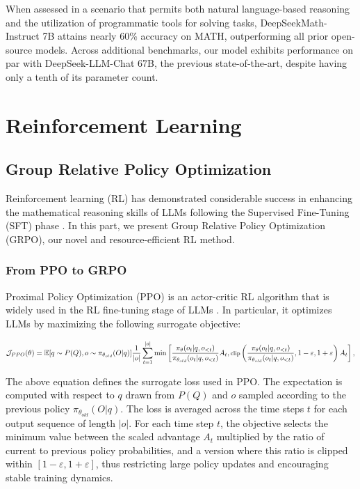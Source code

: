 \begin{itemize}[topsep=0pt]
\begin{itemize}[topsep=0pt]
When assessed in a scenario that permits both natural language-based reasoning and the utilization of programmatic tools for solving tasks, DeepSeekMath-Instruct 7B attains nearly 60\% accuracy on MATH, outperforming all prior open-source models. Across additional benchmarks, our model exhibits performance on par with DeepSeek-LLM-Chat 67B, the previous state-of-the-art, despite having only a tenth of its parameter count.
\section{Reinforcement Learning}

\subsection{Group Relative Policy Optimization} Reinforcement learning (RL) has demonstrated considerable success in enhancing the mathematical reasoning skills of LLMs following the Supervised Fine-Tuning (SFT) phase \citep{wang2023math,wizardmath}. In this part, we present Group Relative Policy Optimization (GRPO), our novel and resource-efficient RL method.

\subsubsection{From PPO to GRPO} Proximal Policy Optimization (PPO) \citep{schulman2017proximal} is an actor-critic RL algorithm that is widely used in the RL fine-tuning stage of LLMs \citep{ouyang2022training}. In particular, it optimizes LLMs by maximizing the following surrogate objective:

\begin{equation}
\footnotesize
    \mathcal{J}_{PPO}(\theta) = \mathbb{E}{[q \sim P(Q), o \sim \pi_{\theta_{old}}(O|q)]} \frac{1}{|o|} \sum_{t=1}^{|o|} \min \left[ \frac{\pi_\theta(o_{t} | q, o_{<t})}{\pi_{\theta_{old}}(o_{t} | q, o_{<t})} A_{t}, \text{clip} \left( \frac{\pi_\theta(o_{t} | q, o_{<t})}{\pi_{\theta_{old}}(o_{t} | q, o_{<t})}, 1 - \varepsilon, 1 + \varepsilon \right)  A_{t} \right] ,
\end{equation}

The above equation defines the surrogate loss used in PPO. The expectation is computed with respect to $q$ drawn from $P(Q)$ and $o$ sampled according to the previous policy $\pi_{\theta_{old}}(O|q)$. The loss is averaged across the time steps $t$ for each output sequence of length $|o|$. For each time step $t$, the objective selects the minimum value between the scaled advantage $A_t$ multiplied by the ratio of current to previous policy probabilities, and a version where this ratio is clipped within $[1 - \varepsilon, 1 + \varepsilon]$, thus restricting large policy updates and encouraging stable training dynamics.


\end{itemize}
\end{itemize}
